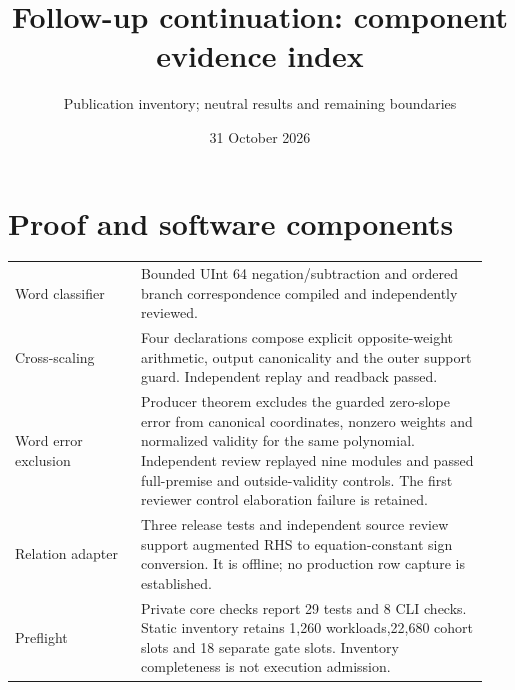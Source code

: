 \documentclass[10 pt]{article}
\begin{document}
\title{Follow-up continuation: component evidence index}
\author{Publication inventory; neutral results and remaining boundaries}
\date{31 October 2026}\maketitle
\section*{Proof and software components}
\begin{tabular}{p{0.25\linewidth}p{0.69\linewidth}}
Word classifier & Bounded UInt 64 negation/subtraction and ordered branch correspondence compiled and independently reviewed.\\[5 pt]
Cross-scaling & Four declarations compose explicit opposite-weight arithmetic, output canonicality and the outer support guard. Independent replay and readback passed.\\[5 pt]
Word error exclusion & Producer theorem excludes the guarded zero-slope error from canonical coordinates, nonzero weights and normalized validity for the same polynomial. Independent review replayed nine modules and passed full-premise and outside-validity controls. The first reviewer control elaboration failure is retained.\\[5 pt]
Relation adapter & Three release tests and independent source review support augmented RHS to equation-constant sign conversion. It is offline; no production row capture is established.\\[5 pt]
Preflight & Private core checks report 29 tests and 8 CLI checks. Static inventory retains 1,260 workloads,22,680 cohort slots and 18 separate gate slots. Inventory completeness is not execution admission.\\
\end{tabular}
\newpage
\end{document}

